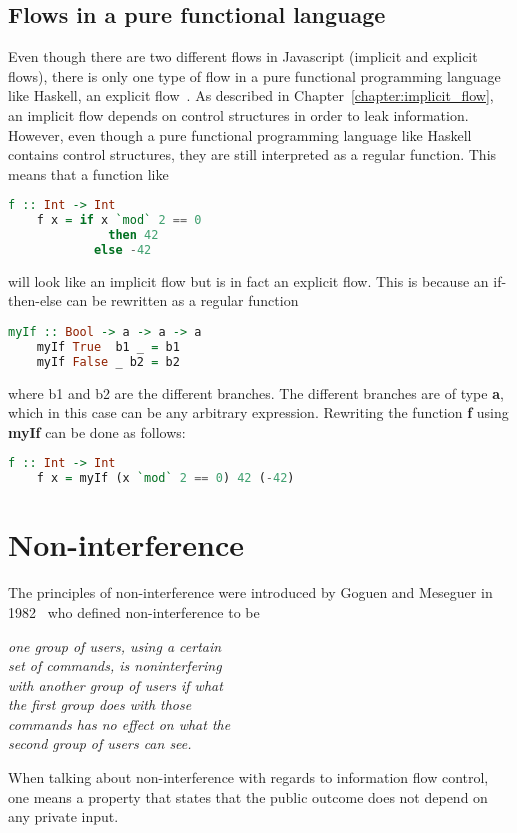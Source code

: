 \subsection{Flows in a pure functional language}
Even though there are two different flows in Javascript (implicit and explicit flows), there is only one type of flow in a pure functional programming language like Haskell, an explicit flow~\cite{seclib}. As described in Chapter~\ref{chapter:implicit_flow}, an implicit flow depends on control structures in order to leak information. However, even though a pure functional programming language like Haskell contains control structures, they are still interpreted as a regular function. This means that a function like
\begin{center}
  \begin{lstlisting}[language=Haskell]
    f :: Int -> Int
    f x = if x `mod` 2 == 0
              then 42
            else -42
  \end{lstlisting}
\end{center}
will look like an implicit flow but is in fact an explicit flow. This is because an if-then-else can be rewritten as a regular function~\cite{if-then-else}
\begin{center}
  \begin{lstlisting}[language=Haskell]
    myIf :: Bool -> a -> a -> a
    myIf True  b1 _ = b1
    myIf False _ b2 = b2
  \end{lstlisting}
\end{center}
where b1 and b2 are the different branches. The different branches are of type \textbf{a}, which in this case can be any arbitrary expression. Rewriting the function \textbf{f} using \textbf{myIf} can be done as follows:
\begin{center}
  \begin{lstlisting}[language=Haskell]
    f :: Int -> Int
    f x = myIf (x `mod` 2 == 0) 42 (-42)
  \end{lstlisting}
\end{center}

\section{Non-interference}
The principles of non-interference were introduced by Goguen and Meseguer in 1982~\cite{non-interference-goguen-meseguer} who defined non-interference to be
\newline
\begin{center}
  \emph{one group of users, using a certain\\set of commands, is noninterfering\\with another group of users if what\\the first group does with those\\commands has no effect on what the\\second group of users can see.}
\end{center}
When talking about non-interference with regards to information flow control, one means a property that states that the public outcome does not depend on any private input.

